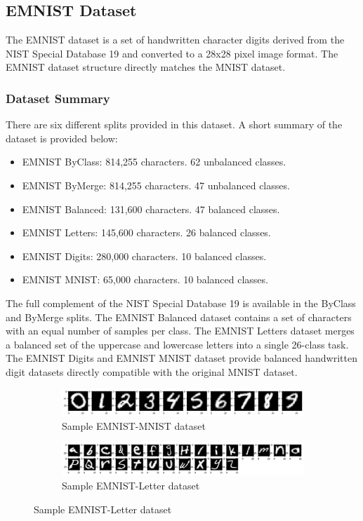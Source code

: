 \subsection{EMNIST Dataset}
The EMNIST dataset is a set of handwritten character digits derived from the NIST Special Database 19
and converted to a 28x28 pixel image format. The EMNIST dataset structure directly matches the MNIST dataset.

\subsubsection{Dataset Summary}
There are six different splits provided in this dataset. A short summary of the dataset is provided below:
\begin{itemize}
  \item EMNIST ByClass: 814,255 characters. 62 unbalanced classes.
  \item EMNIST ByMerge: 814,255 characters. 47 unbalanced classes.
  \item EMNIST Balanced:  131,600 characters. 47 balanced classes.
  \item EMNIST Letters: 145,600 characters. 26 balanced classes.
  \item EMNIST Digits: 280,000 characters. 10 balanced classes.
  \item EMNIST MNIST: 65,000 characters. 10 balanced classes.
\end{itemize}
The full complement of the NIST Special Database 19 is available in the ByClass and ByMerge splits. The EMNIST Balanced dataset contains a set of characters with an equal number of samples per class.
The EMNIST Letters dataset merges a balanced set of the uppercase and lowercase letters into a single 26-class task. The EMNIST Digits and EMNIST MNIST dataset provide balanced handwritten digit datasets directly compatible with the original MNIST dataset.

\begin{figure}[htb!]
        \centering
        \begin{subfigure}[b]{\textwidth}
            \centering
            \includegraphics[width=\linewidth]{images/digit.png}
            \caption{Sample EMNIST-MNIST dataset}
            \label{fig:EMNIST MNIST dataset}
        \end{subfigure}%
        \label{fig:Rotate-misclassifications}
        \begin{subfigure}[b]{\textwidth}
            \centering
            \includegraphics[width=\linewidth]{images/letter.png}
            \caption{Sample EMNIST-Letter dataset}
            \label{fig:EMNIST MNIST dataset}
        \end{subfigure}%
        \label{fig:Rotate-misclassifications}
    \end{figure}
    \FloatBarrier

